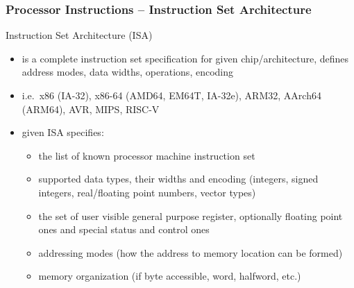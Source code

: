 \documentclass{beamer}
\begin{document}
\begin{frame}
\frametitle{Processor Instructions -- Instruction Set Architecture}

Instruction Set Architecture (ISA)
\begin{itemize}
\item  is a complete instruction set specification for given chip/architecture, defines address modes, data widths, operations, encoding
\item i.e.\ x86 (IA-32), x86-64 (AMD64, EM64T, IA-32e), ARM32, AArch64 (ARM64), AVR, MIPS, RISC-V
\item given ISA specifies:
\begin{itemize}
\item the list of known processor machine instruction set
\item supported data types, their widths and encoding (integers, signed integers, real/floating point numbers, vector types)
\item the set of user visible general purpose register, optionally floating point ones and special status and control ones
\item addressing modes (how the address to memory location can be formed)
\item memory organization (if byte accessible, word, halfword, etc.)
\end{itemize}
\end{itemize}

\end{frame}
\end{document}
